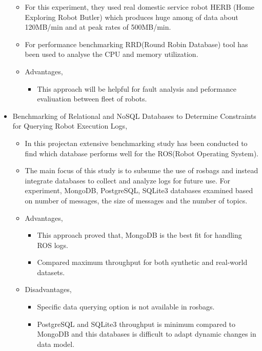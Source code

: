 \documentclass[12pt]{article}
\begin{document}
\begin{itemize}
\begin{itemize}
\item For this experiment, they used real domestic service robot HERB (Home Exploring Robot Butler) which produces huge among of data about 120MB/min and at peak rates of 500MB/min.

\item For performance benchmarking RRD(Round Robin Database) tool has been used to analyse the CPU and memory utilization.

\item Advantages,
\begin{itemize}
\item This approach will be helpful for fault analysis and peformance evaliuation between fleet of robots.
\end{itemize}
\end{itemize}

\item Benchmarking of Relational and NoSQL Databases to Determine Constraints for Querying Robot Execution Logs\cite{reference3},

\begin{itemize}
\item In this projectan extensive benchmarking study has been conducted to find which database performs well for the ROS(Robot Operating System).

\item The main focus of this study is to subsume the use of rosbags and instead integrate databases to collect and analyze logs for future use. For experiment, MongoDB, PostgreSQL, SQLite3 databases examined based on number of messages, the size of messages and the number of topics.

\item Advantages,
\begin{itemize}
\item This approach proved that, MongoDB is the best fit for handling ROS logs.
\item Compared maximum throughput for both synthetic and real-world datasets.
\end{itemize}

\item Disadvantages,
\begin{itemize}
\item Specific data querying option is not available in rosbags.
\item PostgreSQL and SQLite3 throughput is minimum compared to MongoDB and this databases is difficult to adapt dynamic changes in data model.
\end{itemize}
\end{itemize}
\newpage


\end{itemize}
\end{document}
